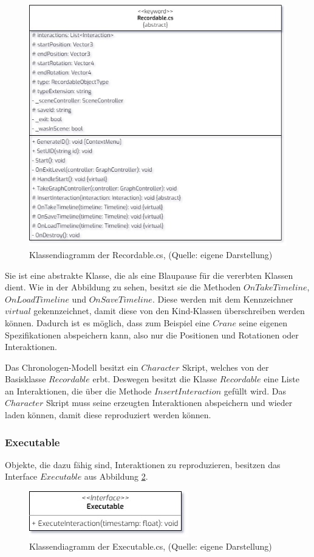 \begin{figure}[ht]
\centering
\includegraphics[width=0.6\linewidth]{content/pictures/Recordable.jpg}
\caption{Klassendiagramm der Recordable.cs, (Quelle: eigene Darstellung)}
\label{fig:recordable-cs}
\end{figure}

Sie ist eine abstrakte Klasse, die als eine Blaupause für die vererbten Klassen dient. Wie in der Abbildung zu sehen, besitzt sie die Methoden $OnTakeTimeline$, \\ $OnLoadTimeline$ und $OnSaveTimeline$. Diese werden mit dem Kennzeichner $virtual$ gekennzeichnet, damit diese von den Kind-Klassen überschreiben werden können. Dadurch ist es möglich, dass zum Beispiel eine $Crane$ seine eigenen Spezifikationen abspeichern kann, also nur die Positionen und Rotationen oder Interaktionen.

Das Chronologen-Modell besitzt ein $Character$ Skript, welches von der Basisklasse $Recordable$ erbt. Deswegen besitzt die Klasse $Recordable$ eine Liste an Interaktionen, die über die Methode $InsertInteraction$ gefüllt wird. Das $Character$ Skript muss seine erzeugten Interaktionen abspeichern und wieder laden können, damit diese reproduziert werden können.

\subsubsection{Executable}
Objekte, die dazu fähig sind, Interaktionen zu reproduzieren, besitzen das Interface $Executable$ aus Abbildung \ref{fig:executable-cs}.

\begin{figure}[ht]
\centering
\includegraphics[width=0.4\linewidth]{content/pictures/Executable.jpg}
\caption{Klassendiagramm der Executable.cs, (Quelle: eigene Darstellung)}
\label{fig:executable-cs}
\end{figure}

